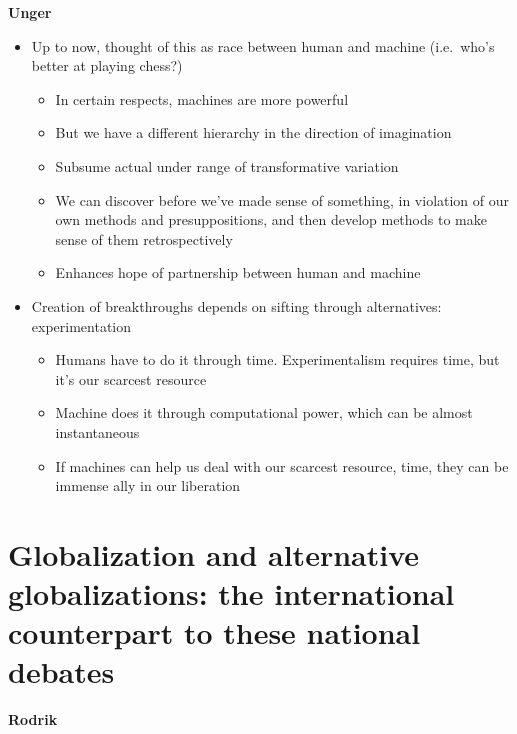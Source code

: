 \textbf{Unger}

\begin{itemize}
\tightlist
\item
  Up to now, thought of this as race between human and machine
  (i.e.~who's better at playing chess?)

  \begin{itemize}
  \tightlist
  \item
    In certain respects, machines are more powerful
  \item
    But we have a different hierarchy in the direction of imagination
  \item
    Subsume actual under range of transformative variation
  \item
    We can discover before we've made sense of something, in violation
    of our own methods and presuppositions, and then develop methods to
    make sense of them retrospectively
  \item
    Enhances hope of partnership between human and machine
  \end{itemize}
\item
  Creation of breakthroughs depends on sifting through alternatives:
  experimentation

  \begin{itemize}
  \tightlist
  \item
    Humans have to do it through time. Experimentalism requires time,
    but it's our scarcest resource
  \item
    Machine does it through computational power, which can be almost
    instantaneous
  \item
    If machines can help us deal with our scarcest resource, time, they
    can be immense ally in our liberation
  \end{itemize}
\end{itemize}

\hypertarget{globalization-and-alternative-globalizations-the-international-counterpart-to-these-national-debates}{%
\section{Globalization and alternative globalizations: the international
counterpart to these national
debates}\label{globalization-and-alternative-globalizations-the-international-counterpart-to-these-national-debates}}

\textbf{Rodrik}

